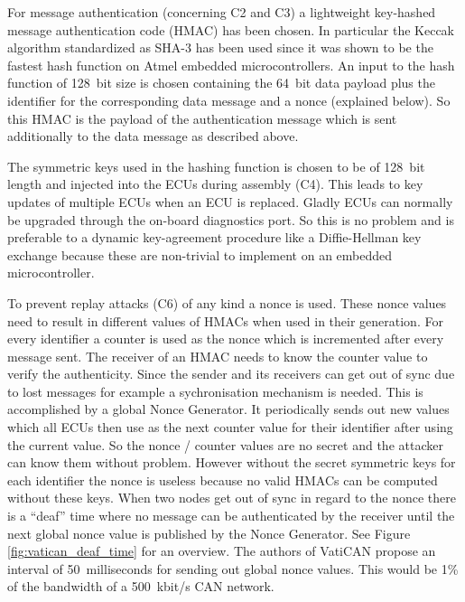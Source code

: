 For message authentication (concerning C2 and C3) a lightweight key-hashed
message authentication code (HMAC) has been chosen. In particular the Keccak
algorithm standardized as SHA-3 has been used since it was shown to be the
fastest hash function on Atmel embedded microcontrollers. An input to the hash
function of 128~bit size is chosen containing the 64~bit data payload plus the
identifier for the corresponding data message and a nonce (explained below). So
this HMAC is the payload of the authentication message which is sent
additionally to the data message as described above.

The symmetric keys used in the hashing function is chosen to be of 128~bit
length and injected into the ECUs during assembly (C4). This leads to key
updates of multiple ECUs when an ECU is replaced. Gladly ECUs can normally be
upgraded through the on-board diagnostics port. So this is no problem and is
preferable to a dynamic key-agreement procedure like a Diffie-Hellman key
exchange because these are non-trivial to implement on an embedded
microcontroller.

To prevent replay attacks (C6) of any kind a nonce is used. These nonce values
need to result in different values of HMACs when used in their generation. For
every identifier a counter is used as the nonce which is incremented after every
message sent. The receiver of an HMAC needs to know the counter value to verify
the authenticity. Since the sender and its receivers can get out of sync due to
lost messages for example a sychronisation mechanism is needed. This is
accomplished by a global Nonce Generator. It periodically sends out new values
which all ECUs then use as the next counter value for their identifier after
using the current value. So the nonce / counter values are no secret and the
attacker can know them without problem. However without the secret symmetric
keys for each identifier the nonce is useless because no valid HMACs can be
computed without these keys. When two nodes get out of sync in regard to the
nonce there is a ``deaf'' time where no message can be authenticated by the
receiver until the next global nonce value is published by the Nonce Generator.
See Figure \ref{fig:vatican_deaf_time} for an overview. The authors of VatiCAN
propose an interval of 50~milliseconds for sending out global nonce values. This
would be 1\% of the bandwidth of a 500~kbit/s CAN network.

